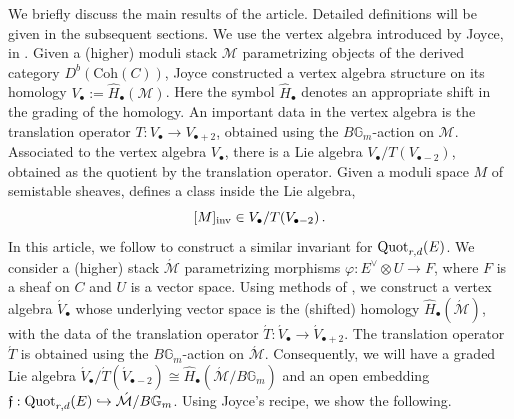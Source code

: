 \documentclass[11pt]{amsart}
\theoremstyle{remark}
\newcommand{\mf}[1]{\mathfrak{#1}}
\newcommand{\mb}[1]{\mathbb{#1}}
\newcommand{\M}{\mathcal{M}}
\newcommand{\Mdash}{\acute{\mathcal{M}}}
\newcommand{\wh}[1]{\widehat{#1}}
\newcommand{\vp}[0]{\varphi}
\newcommand{\quot}[0]{\textnormal{Quot}}
\newcommand{\inv}[0]{\textnormal{inv}}
\numberwithin{theorem}{section}
\begin{document}
    We briefly discuss the main results of the article. 
    Detailed definitions will be given in the subsequent sections.
    We use the vertex algebra introduced by Joyce,
    in \cite{Joy19, GJT22}.
    Given a (higher) moduli stack $\M$ parametrizing objects of the derived category $D^b(\text{Coh}(C))$,
    Joyce constructed a vertex algebra structure on its homology
    $V_\bullet := \wh H_{\bullet}(\M)$.
    Here the symbol $\wh{H}_\bullet$ denotes an appropriate shift in the grading of the homology.
    An important data in the vertex algebra is the translation operator $T: V_\bullet \to V_{\bullet+2}$,
    obtained using the
    $B\mb G_m$-action on $\M$.
    Associated to the vertex algebra $V_\bullet$, there is a 
    Lie algebra $V_\bullet/T(V_{\bullet-2})$,
    obtained as the quotient by the translation operator.
    Given a moduli space $M$ of semistable sheaves,
    \cite{Joy19} defines a class inside the Lie algebra,
    $$[M]_\inv \in V_\bullet/T(V_{\bullet-2})\,.$$
    In this article, we follow \cite{Joy19} to construct a similar
    invariant for $\quot_{r,d}(E)$.
    We consider a (higher) stack $\Mdash$ parametrizing morphisms
    $\vp: E^\vee \otimes U \to F$, where $F$ is a sheaf on $C$
    and $U$ is a vector space.
    Using methods of \cite[Chapter 8]{Joy19}, 
    we construct a vertex algebra $\acute V_\bullet$ whose underlying vector space is the (shifted) homology $\wh H_\bullet(\Mdash)$,
    with the data of the translation operator 
    $\acute{T}: \acute V_\bullet \to \acute V_{\bullet+2}$.
    The translation operator $\acute{T}$ is obtained using the
    $B\mb G_m$-action on $\Mdash$.
    Consequently, we will have a graded Lie algebra
    $\acute V_\bullet/\acute T(\acute V_{\bullet-2}) \cong \wh H_{\bullet}(\Mdash/B \mb G_m)$
    and an open embedding $\mf f: \quot_{r,d}(E) \hookrightarrow \Mdash/B \mb G_m$.
    Using Joyce's recipe, we show the following.
\end{document}
